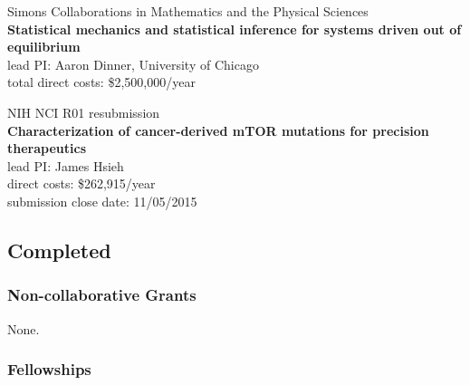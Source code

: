 \documentclass[10pt]{article}
\begin{document}
\vspace{2ex}

Simons Collaborations in Mathematics and the Physical Sciences\\
{\bf Statistical mechanics and statistical inference for systems driven out of equilibrium}\\
lead PI: Aaron Dinner, University of Chicago\\
total direct costs: \$2,500,000/year

\vspace{2ex}


NIH NCI R01 resubmission\\
{\bf Characterization of cancer-derived mTOR mutations for precision therapeutics}\\
lead PI: James Hsieh\\
direct costs: \$262,915/year\\
submission close date: 11/05/2015

%


\eject
\subsection*{Completed}

\subsubsection*{Non-collaborative Grants}

None.

\subsubsection*{Fellowships}
\end{document}
